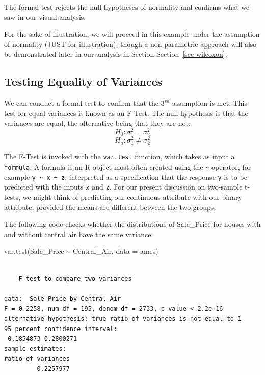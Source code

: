 \documentclass[
  letterpaper,
  DIV=11,
  numbers=noendperiod]{scrreprt}
\newenvironment{Shaded}{\begin{snugshade}}{\end{snugshade}}
\newcommand{\AttributeTok}[1]{\textcolor[rgb]{0.40,0.45,0.13}{#1}}
\newcommand{\FunctionTok}[1]{\textcolor[rgb]{0.28,0.35,0.67}{#1}}
\newcommand{\NormalTok}[1]{\textcolor[rgb]{0.00,0.23,0.31}{#1}}
\newcommand{\SpecialCharTok}[1]{\textcolor[rgb]{0.37,0.37,0.37}{#1}}
\begin{document}
The formal test rejects the null hypotheses of normality and confirms
what we saw in our visual analysis.

For the sake of illustration, we will proceed in this example under the
assumption of normality (JUST for illustration), though a non-parametric
approach will also be demonstrated later in our analysis in Section
Section~\ref{sec-wilcoxon}.

\hypertarget{sec-ftest}{%
\subsection{Testing Equality of Variances}\label{sec-ftest}}

We can conduct a formal test to confirm that the \(3^{rd}\) assumption
is met. This test for equal variances is known as an F-Test. The null
hypothesis is that the variances are equal, the alternative being that
they are not: \[H_0: \sigma_1^2 = \sigma_2^2\]
\[H_a: \sigma_1^2 \neq \sigma_2^2\]

The F-Test is invoked with the \texttt{var.test} function, which takes
as input a \texttt{formula}. A formula is an R object most often created
using the \texttt{\textasciitilde{}} operator, for example
\texttt{y\ \textasciitilde{}\ x\ +\ z}, interpreted as a specification
that the response \texttt{y} is to be predicted with the inputs
\texttt{x} and \texttt{z}. For our present discussion on two-sample
t-tests, we might think of predicting our continuous attribute with our
binary attribute, provided the means are different between the two
groups.

The following code checks whether the distributions of Sale\_Price for
houses with and without central air have the same variance.

\begin{Shaded}
\begin{Highlighting}[]
\FunctionTok{var.test}\NormalTok{(Sale\_Price }\SpecialCharTok{\textasciitilde{}}\NormalTok{ Central\_Air, }\AttributeTok{data =}\NormalTok{ ames)}
\end{Highlighting}
\end{Shaded}

\begin{verbatim}

    F test to compare two variances

data:  Sale_Price by Central_Air
F = 0.2258, num df = 195, denom df = 2733, p-value < 2.2e-16
alternative hypothesis: true ratio of variances is not equal to 1
95 percent confidence interval:
 0.1854873 0.2800271
sample estimates:
ratio of variances 
         0.2257977 
\end{verbatim}
\end{document}
